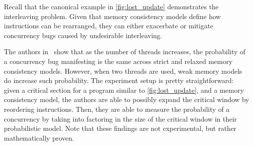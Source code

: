 Recall that the canonical example in \autoref{fig:lost_update}
demonstrates the interleaving problem. Given that memory
consistency models define how instructions can be rearranged,
they can either exacerbate or mitigate concurrency bugs
caused by undesirable interleaving.

The authors in~\cite{jaffe2011impactOfMemoryModels} show that
as the number of threads increases, the probability
of a concurrency bug manifesting is the same across strict and relaxed
memory consistency models. However, when two threads are used,
weak memory models do increase such probability. The experiment setup
is pretty straightforward: given a critical section for a program
similar to \autoref{fig:lost_update}, and a
memory consistency model, the authors are able to possibly
expand the critical window by reordering instructions.
Then, they are able to measure the probability of a concurrency
by taking into factoring in the size of the critical window
in their probabilistic model.
Note that these findings are not experimental, but rather
mathematically proven.
